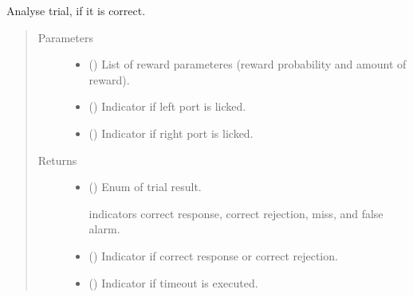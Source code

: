 \documentclass[letterpaper,10pt,english]{sphinxmanual}
\begin{document}

\begin{fulllineitems}
\label{\detokenize{NoSeMazeControl/TrialLogic:TrialLogic.TrialConditions.trial_result}}
\pysigstartsignatures
{}
\pysigstopsignatures
\sphinxAtStartPar
Analyse trial, if it is correct.
\begin{quote}\begin{description}
\item[{Parameters}] \leavevmode\begin{itemize}
\item {} 
\sphinxAtStartPar
{} () \textendash{} List of reward parameteres (reward probability and amount of reward).

\item {} 
\sphinxAtStartPar
{} () \textendash{} Indicator if left port is licked.

\item {} 
\sphinxAtStartPar
{} () \textendash{} Indicator if right port is licked.

\end{itemize}

\item[{Returns}] \leavevmode
\sphinxAtStartPar
\begin{itemize}
\item {} 
\sphinxAtStartPar
{} () \textendash{} Enum of trial result.

 indicators \sphinxhyphen{} correct response, correct rejection, miss, and
false alarm.

\item {} 
\sphinxAtStartPar
{} () \textendash{} Indicator if correct response or correct rejection.

\item {} 
\sphinxAtStartPar
{} () \textendash{} Indicator if timeout is executed.

\end{itemize}


\end{description}\end{quote}

\end{fulllineitems}
\end{document}
